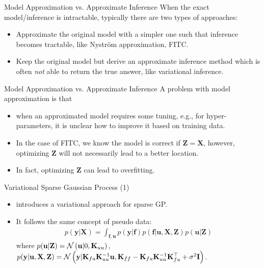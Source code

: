 \documentclass[14pt,aspectratio=1610]{beamer}
\newcommand{\yV}{\mathbf{y}}
\newcommand{\fV}{\mathbf{f}}
\newcommand{\xM}{\mathbf{X}}
\newcommand{\K}{\mathbf{K}}
\newcommand{\uV}{\mathbf{u}}
\newcommand{\zM}{\mathbf{Z}}
\newcommand{\I}{\mathbf{I}}
\begin{document}
\begin{frame}{Model Approximation vs. Approximate Inference}
When the exact model/inference is intractable, typically there are two types of approaches:
\begin{itemize}
\item Approximate the original model with a simpler one such that inference becomes tractable, like Nystr\"{o}m approximation, FITC.
\item Keep the original model but derive an approximate inference method which is often \textit{not} able to return the true answer, like variational inference.
\end{itemize}

\end{frame}

\begin{frame}{Model Approximation vs. Approximate Inference}
A problem with model approximation is that 
\begin{itemize}
\item when an approximated model requires some tuning, e.g., for hyper-parameters, it is unclear how to improve it based on training data.

\item In the case of FITC, we know the model is correct if $\zM = \xM$, however, optimizing $\zM$ will not necessarily lead to a better location.

\item In fact, optimizing $\zM$ can lead to overfitting. \citep{QuinoneroRasmussen2005}
\end{itemize}

\end{frame}

\begin{frame}{Variational Sparse Gaussian Process (1)}

\begin{itemize}
\item \cite{Titsias2009} introduces a variational approach for sparse GP.
\item It follows the same concept of pseudo data:
\begin{align*}
p(\yV| \xM) = \int_{\fV, \uV} p(\yV| \fV) p(\fV| \uV, \xM, \zM) p(\uV| \zM)
\end{align*}
where $p(\uV| \zM) = \gaussianDist{\uV}{0}{\K_{uu}}$, 
$p(\yV| \uV, \xM, \zM)=\gaussianDist{\yV}{\K_{fu} \K_{uu}^{-1} \uV}{\K_{ff} - \K_{fu} \K_{uu}^{-1} \K_{fu}^\top+\sigma^2\I}$.

\end{itemize}
\end{frame}
\end{document}
